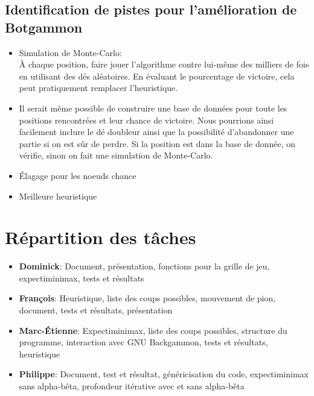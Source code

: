 \documentclass{article}
\begin{document}
\subsection{Identification de pistes pour l’amélioration de Botgammon}
\begin{itemize}
    \item Simulation de Monte-Carlo:\\
        À chaque position, faire jouer l’algorithme contre lui-même des milliers de fois
        en utilisant des dés aléatoires. En évaluant le pourcentage de victoire, cela
        peut pratiquement remplacer l’heuristique.
    \item Il serait même possible de construire une base de données pour toute les
        positions rencontrées et leur chance de victoire. Nous pourrions ainsi
        facilement inclure le dé doubleur ainsi que la possibilité d’abandonner une
        partie si on est sûr de perdre. Si la position est dans la base de donnée, on
        vérifie, sinon on fait une simulation de Monte-Carlo.
    \item Élagage pour les noeuds chance
    \item Meilleure heuristique
\end{itemize}


\section{Répartition des tâches}
\begin{itemize}
    \item \textbf{Dominick}: Document, présentation, fonctions pour la grille de jeu, expectiminimax,
        tests et résultats
    \item \textbf{François}: Heuristique, liste des coups possibles, mouvement de pion, document,
        tests et résultats, présentation
    \item \textbf{Marc-Étienne}: Expectiminimax, liste des coups possibles, structure du programme,
        interaction avec GNU Backgammon, tests et résultats, heuristique
    \item \textbf{Philippe}: Document, test et résultat, généricisation du code, expectiminimax
        sans alpha-bêta, profondeur itérative avec et sans alpha-bêta
\end{itemize}
\end{document}
